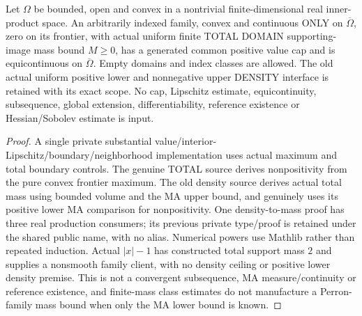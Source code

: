 \begin{lemma}
  \label{lem:domain-dirichlet-equicontinuity}
  \leanok
  Let $\Omega$ be bounded, open and convex in a nontrivial finite-dimensional
  real inner-product space. An arbitrarily indexed family, convex and continuous
  ONLY on $\overline\Omega$, zero on its frontier, with actual uniform finite
  TOTAL DOMAIN supporting-image mass bound $M\ge0$, has a generated common
  positive value cap and is equicontinuous on $\overline\Omega$. Empty domains
  and index classes are allowed. The old actual uniform positive lower and
  nonnegative upper DENSITY interface is retained with its exact scope.
  No cap, Lipschitz estimate, equicontinuity, subsequence, global extension,
  differentiability, reference existence or Hessian/Sobolev estimate is input.
\end{lemma}
\begin{proof}
  \leanok
  A single private substantial value/interior-Lipschitz/boundary/neighborhood
  implementation uses actual maximum and total boundary controls. The genuine
  TOTAL source derives nonpositivity from the pure convex frontier maximum.
  The old density source derives actual total mass using bounded volume and
  the MA upper bound, and genuinely uses its positive lower MA comparison for
  nonpositivity. One density-to-mass proof has three real production consumers;
  its previous private type/proof is retained under the shared public name,
  with no alias. Numerical powers use Mathlib rather than repeated induction.
  Actual $|x|-1$ has constructed total support mass $2$ and supplies a nonsmooth
  family client, with no density ceiling or positive lower density premise.
  This is not a convergent subsequence, MA measure/continuity or reference
  existence, and finite-mass class estimates do not manufacture a Perron-family
  mass bound when only the MA lower bound is known.
\end{proof}

